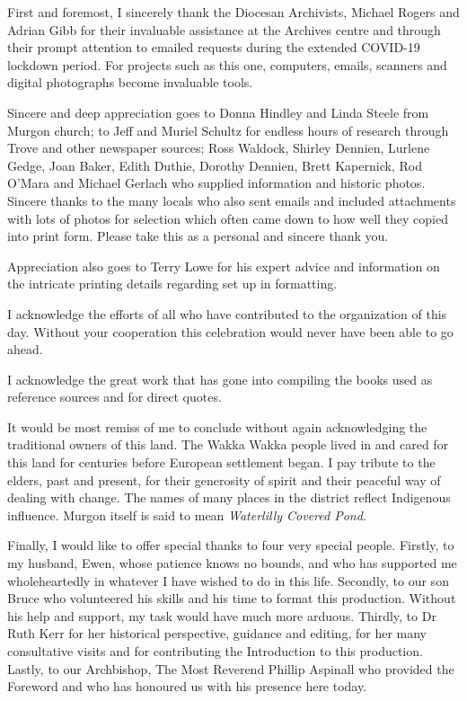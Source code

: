 First and foremost, I sincerely thank the Diocesan Archivists, Michael Rogers and Adrian Gibb for their invaluable assistance at the Archives centre and through their prompt attention to emailed requests during the extended COVID-19 lockdown period. For projects such as this one, computers, emails, scanners and digital photographs become invaluable tools.



Sincere and deep appreciation goes to Donna Hindley and Linda Steele from Murgon church; to Jeff and Muriel Schultz for endless hours of research through Trove and other newspaper sources; Ross Waldock, Shirley Dennien, Lurlene Gedge, Joan Baker, Edith Duthie, Dorothy Dennien, Brett Kapernick, Rod O'Mara and Michael Gerlach who supplied information and historic photos. Sincere thanks to the many locals who also sent emails and included attachments with lots of photos for selection which often came down to how well they copied into print form. Please take this as a personal and sincere thank you.



Appreciation also goes to Terry Lowe for his expert advice and information on the intricate printing details regarding set up in formatting.



I acknowledge the efforts of all who have contributed to the organization of this day. Without your cooperation this celebration would never have been able to go ahead.



I acknowledge the great work that has gone into compiling the books used as reference sources and for direct quotes.



It would be most remiss of me to conclude without again acknowledging the traditional owners of this land. The Wakka Wakka people lived in and cared for this land for centuries before European settlement began. I pay tribute to the elders, past and present, for their generosity of spirit and their peaceful way of dealing with change. The names of many places in the district reflect Indigenous influence. Murgon itself is said to mean \emph{Waterlilly Covered Pond}.



\balance
Finally, I would like to offer special thanks to four very special people. Firstly, to my husband, Ewen, whose patience knows no bounds, and who has supported me wholeheartedly in whatever I have wished to do in this life. Secondly, to our son Bruce who volunteered his skills and his time to format this production. Without his help and support, my task would have much more arduous. Thirdly, to Dr Ruth Kerr for her historical perspective, guidance and editing, for her many consultative visits and for contributing the Introduction to this production. Lastly, to our Archbishop, The Most Reverend Phillip Aspinall who provided the Foreword and who has honoured us with his presence here today.

